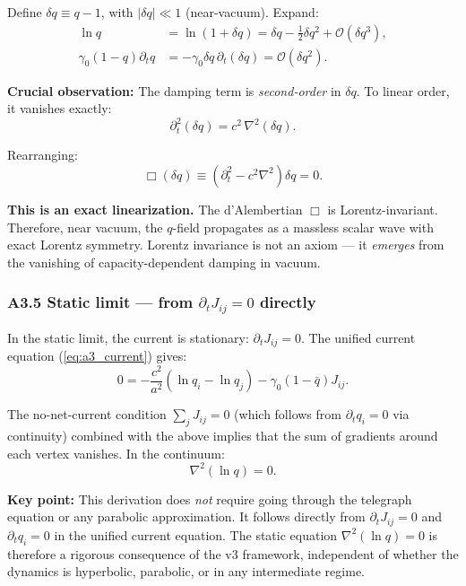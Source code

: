 \documentclass[reprint]{revtex4-2}
\begin{document}
Define $\delta q \equiv q-1$, with $|\delta q| \ll 1$ (near-vacuum). Expand:
\begin{align}
\ln q &= \ln(1 + \delta q) = \delta q - \frac{1}{2}\delta q^2 + \mathcal{O}(\delta q^3), \\
\gamma_0(1-q)\partial_t q &= -\gamma_0\delta q\,\partial_t(\delta q) = \mathcal{O}(\delta q^2).
\end{align}

\textbf{Crucial observation:} The damping term is \emph{second-order} in $\delta q$. To linear order, it vanishes exactly:
\begin{equation}
\partial_t^2(\delta q) = c^2\,\nabla^2(\delta q).
\end{equation}

Rearranging:
\begin{equation}
\boxed{\Box(\delta q) \equiv \left(\partial_t^2 - c^2\nabla^2\right)\delta q = 0}.
\label{eq:a3_dalembert}
\end{equation}

\textbf{This is an exact linearization.} The d'Alembertian $\Box$ is Lorentz-invariant. Therefore, near vacuum, the $q$-field propagates as a massless scalar wave with exact Lorentz symmetry. Lorentz invariance is not an axiom --- it \emph{emerges} from the vanishing of capacity-dependent damping in vacuum.

\subsubsection{A3.5 Static limit --- from $\partial_t J_{ij}=0$ directly}

In the static limit, the current is stationary: $\partial_t J_{ij} = 0$. The unified current equation (\ref{eq:a3_current}) gives:
\begin{equation}
0 = -\frac{c^2}{a^2}(\ln q_i - \ln q_j) - \gamma_0(1-\bar{q})J_{ij}.
\end{equation}

The no-net-current condition $\sum_j J_{ij} = 0$ (which follows from $\partial_t q_i = 0$ via continuity) combined with the above implies that the sum of gradients around each vertex vanishes. In the continuum:
\begin{equation}
\boxed{\nabla^2(\ln q) = 0}.
\label{eq:a3_static}
\end{equation}

\textbf{Key point:} This derivation does \emph{not} require going through the telegraph equation or any parabolic approximation. It follows directly from $\partial_t J_{ij}=0$ and $\partial_t q_i=0$ in the unified current equation. The static equation $\nabla^2(\ln q)=0$ is therefore a rigorous consequence of the v3 framework, independent of whether the dynamics is hyperbolic, parabolic, or in any intermediate regime.
\end{document}
